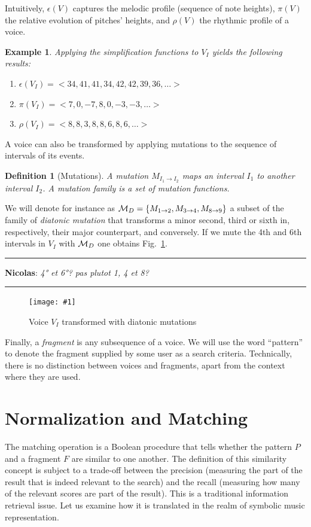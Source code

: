\documentclass[letterpaper, 11pt]{article}
\newtheorem{Definition}{Definition}
\newtheorem{Example}{Example}
\newcommand{\figWithSize}[3]
{
\begin{figure}[ht]
 \centerline{
 \texttt{[image: \#1]}}
 \caption{\label{#1} #2}
\end{figure}
}
\newcommand{\remNT}[1]{%
\vspace*{0.1cm}
\hrule
\medskip
\noindent
\textbf{\textcolor{mygreen}{Nicolas}}: \textit{#1}
\medskip
\hrule
\vspace*{0.1cm}
}
\begin{document}
Intuitively, $\epsilon(V)$
captures the melodic profile (sequence of note heights), $\pi(V)$  the
relative evolution of pitches' heights, and $\rho(V)$ the rhythmic profile of a voice.


\begin{Example}\label{ex-descr}
Applying the simplification functions to $V_I$ yields the following results:
\begin{enumerate}
   \item $\epsilon(V_I) = <34, 41, 41, 34, 42, 42, 39, 36,\ldots>$
   \item $\pi(V_I) = <7, 0, -7, 8, 0, -3, -3,\ldots>$
   \item $\rho(V_I)=<8, 8, 3, 8, 8, 6, 8, 6,\ldots>$
\end{enumerate}

\end{Example}

A voice can also be transformed by applying  mutations to the sequence of intervals of its
events.

\begin{Definition}[Mutations]
A mutation $M_{I_{1}\rightarrow  I_{2}}$ maps an interval $I_{1}$ to another interval
$I_{2}$.  A \emph{mutation family} is a set of mutation functions. 
\end{Definition}

We will denote 
for instance as ${\cal M}_D = \{M_{1\rightarrow 2}, M_{3\rightarrow 4}, M_{8\rightarrow 9}\}$ a subset of the family of \emph{diatonic mutation}
that transforms a minor second, third or sixth in, respectively, their major counterpart, and conversely.
If we mute the 4th and 6th intervals in $V_I$ with  ${\cal M}_D$ one
obtains Fig.~\ref{mutated_voice}.

\remNT{4° et 6°? pas plutot 1, 4 et 8?}

\figWithSize{mutated_voice}{Voice $V_I$ transformed with diatonic mutations}{11cm}

Finally, a \emph{fragment} is any subsequence of a voice. We will use the word ``pattern'' to denote the 
fragment supplied by some user as a search
criteria. Technically, there is no distinction between voices and fragments, apart from the context 
where they are used.

\section{Normalization and Matching}\label{sec:search} 


The matching operation is a Boolean procedure that tells whether the pattern $P$ and a fragment $F$ 
are similar to one another. The definition of this similarity concept is subject to a trade-off
between the precision (measuring the part of the result that is indeed relevant to the search)
and the recall (measuring how many of the relevant scores are part of the result). This is a traditional
information retrieval issue.  Let us examine how it is translated in the realm of symbolic 
music representation.
\end{document}
